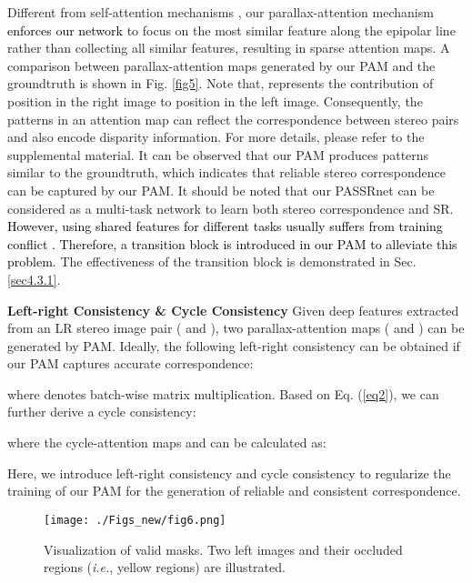 \documentclass[10pt,twocolumn,letterpaper]{article}
\begin{document}
Different from self-attention mechanisms \cite{2018-SelfAttentionGenerativeAdversarialNetworks-Zhang--,2018-DualAttentionNetworkforSceneSegmentation-Fu--}, our parallax-attention mechanism \textcolor{black}{enforces our network} to focus on the most similar feature along the epipolar line rather than collecting all similar features, resulting in sparse attention maps. A comparison between parallax-attention maps generated by our PAM and the groundtruth is shown in Fig. \ref{fig5}. 
Note that,  represents the contribution of position  in the right image to position  in the left image. Consequently, the patterns in an attention map can reflect the correspondence between stereo pairs and also encode disparity information.
For more details, please refer to the supplemental material. It can be observed that our PAM produces patterns similar to the groundtruth, which indicates that reliable stereo correspondence can be captured by our PAM. It should be noted that our PASSRnet can be considered as a multi-task network to learn both stereo correspondence and SR. \textcolor{black}{However, using shared features for different tasks usually suffers from training conflict \cite{2018-MultiTaskLearningAsMultiObjectiveOptimization-Sener--}. Therefore, a transition block is introduced in our PAM to alleviate this problem.} The effectiveness of the transition block is demonstrated in Sec. \ref{sec4.3.1}.

\noindent
\textbf{Left-right Consistency \& Cycle Consistency}
Given deep features extracted from an LR stereo image pair ( and ), two parallax-attention maps ( and ) can be generated by PAM. Ideally, the following left-right consistency can be obtained if our PAM captures accurate correspondence:

where  denotes batch-wise matrix multiplication. Based on Eq. (\ref{eq2}), we can further derive a cycle consistency:

where the cycle-attention maps  and  can be calculated as:

Here, we introduce left-right consistency and cycle consistency to regularize  the training of our PAM for the generation of reliable and consistent correspondence.

\begin{figure}[bt]
	\centering
	\texttt{[image: ./Figs\_new/fig6.png]}
	\caption{Visualization of valid masks. Two left images and their occluded regions (\emph{i.e.}, yellow regions) are illustrated.}
	\label{fig6}
\end{figure}
\end{document}
